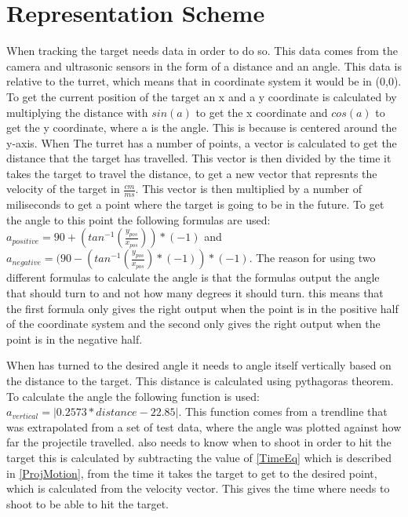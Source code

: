 \chapter{Representation Scheme}
When tracking the target \name needs data in order to do so. This data comes
from the camera and ultrasonic sensors in the form of a distance and an angle.
This data is relative to the turret, which means that in coordinate system it
would be in (0,0). To get the current position of the target an x and a y
coordinate is calculated by multiplying the distance with $sin(a)$ to get the x coordinate and
$cos(a)$ to get the y coordinate, where a is the angle. This is because \name is
centered around the y-axis. When The turret has a number of points, a vector is
calculated to get the distance that the target has travelled. This vector is
then divided by the time it takes the target to travel the distance, to get a new vector that represnts the
velocity of the target in $\frac{cm}{ms}$. This vector is then multiplied by a
number of miliseconds to get a point where the target is going to be in the
future. To get the angle to this point the following formulas are used:
$a_{positive}=90+(tan^{-1}(\frac{y_{pos}}{x_{pos}}))*(-1)$ and
$a_{negative}=(90-(tan^{-1}(\frac{y_{pos}}{x_{pos}})*(-1))*(-1)$. The reason for
using two different formulas to calculate the angle is that the formulas output
the angle that \name should turn to and not how many degrees it should turn.
this means that the first formula only gives the right output when the point is
in the positive half of the coordinate system and the second only gives the
right output when the point is in the negative half.

When \name has turned to the desired angle it needs to angle itself vertically
based on the distance to the target. This distance is calculated using
pythagoras theorem. To calculate the angle the following function is used:
$a_{vertical}=| 0.2573*distance-22.85 |$.
This function comes from a trendline that was extrapolated from a set of test
data, where the angle was plotted against how far the projectile travelled.
\name also needs to know when to shoot in order to hit the target this is
calculated by subtracting the value of \autoref{TimeEq} which is described in
\autoref{ProjMotion}, from the time it takes the target to get to the desired
point, which is calculated from the velocity vector. This gives the time where
\name needs to shoot to be able to hit the target.
